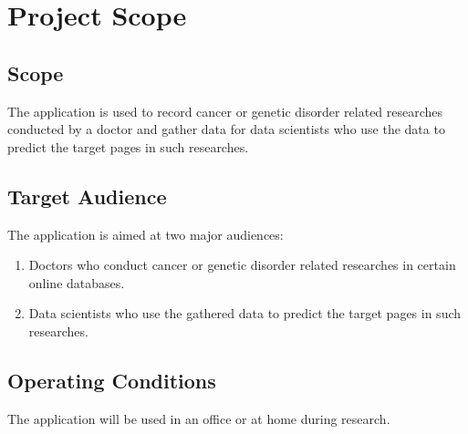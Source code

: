 \chapter{Project Scope}
\label{ch:scope}

\section{Scope}
The application is used to record cancer or genetic disorder related researches conducted by a doctor and gather data for data scientists who use the data to predict the target pages in such researches.
\section{Target Audience}
The application is aimed at two major audiences:
\begin{enumerate}
    \item Doctors who conduct cancer or genetic disorder related researches in certain online databases.
    \item Data scientists who use the gathered data to predict the target pages in such researches.
\end{enumerate}
\section{Operating Conditions}
The application will be used in an office or at home during research.